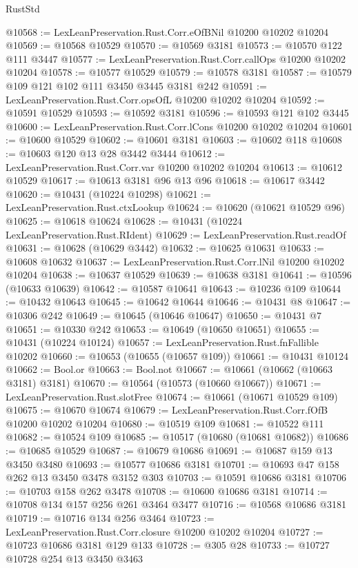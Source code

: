 \begin{lexlean}{RustStd}
\begin{coremodule}
@10568 := LexLeanPreservation.Rust.Corr.eOfBNil @10200 @10202 @10204
@10569 := @10568 @10529
@10570 := @10569 @3181
@10573 := @10570 @122 @111 @3447
@10577 := LexLeanPreservation.Rust.Corr.callOps @10200 @10202 @10204
@10578 := @10577 @10529
@10579 := @10578 @3181
@10587 := @10579 @109 @121 @102 @111 @3450 @3445 @3181 @242
@10591 := LexLeanPreservation.Rust.Corr.opsOfL @10200 @10202 @10204
@10592 := @10591 @10529
@10593 := @10592 @3181
@10596 := @10593 @121 @102 @3445
@10600 := LexLeanPreservation.Rust.Corr.lCons @10200 @10202 @10204
@10601 := @10600 @10529
@10602 := @10601 @3181
@10603 := @10602 @118
@10608 := @10603 @120 @13 @28 @3442 @3444
@10612 := LexLeanPreservation.Rust.Corr.var @10200 @10202 @10204
@10613 := @10612 @10529
@10617 := @10613 @3181 @96 @13 @96
@10618 := @10617 @3442
@10620 := @10431 (@10224 @10298)
@10621 := LexLeanPreservation.Rust.ctxLookup
@10624 := @10620 (@10621 @10529 @96)
@10625 := @10618 @10624
@10628 := @10431 (@10224 LexLeanPreservation.Rust.RIdent)
@10629 := LexLeanPreservation.Rust.readOf
@10631 := @10628 (@10629 @3442)
@10632 := @10625 @10631
@10633 := @10608 @10632
@10637 := LexLeanPreservation.Rust.Corr.lNil @10200 @10202 @10204
@10638 := @10637 @10529
@10639 := @10638 @3181
@10641 := @10596 (@10633 @10639)
@10642 := @10587 @10641
@10643 := @10236 @109
@10644 := @10432 @10643
@10645 := @10642 @10644
@10646 := @10431 @8
@10647 := @10306 @242
@10649 := @10645 (@10646 @10647)
@10650 := @10431 @7
@10651 := @10330 @242
@10653 := @10649 (@10650 @10651)
@10655 := @10431 (@10224 @10124)
@10657 := LexLeanPreservation.Rust.fnFallible @10202
@10660 := @10653 (@10655 (@10657 @109))
@10661 := @10431 @10124
@10662 := Bool.or
@10663 := Bool.not
@10667 := @10661 (@10662 (@10663 @3181) @3181)
@10670 := @10564 (@10573 (@10660 @10667))
@10671 := LexLeanPreservation.Rust.slotFree
@10674 := @10661 (@10671 @10529 @109)
@10675 := @10670 @10674
@10679 := LexLeanPreservation.Rust.Corr.fOfB @10200 @10202 @10204
@10680 := @10519 @109
@10681 := @10522 @111
@10682 := @10524 @109
@10685 := @10517 (@10680 (@10681 @10682))
@10686 := @10685 @10529
@10687 := @10679 @10686
@10691 := @10687 @159 @13 @3450 @3480
@10693 := @10577 @10686 @3181
@10701 := @10693 @47 @158 @262 @13 @3450 @3478 @3152 @303
@10703 := @10591 @10686 @3181
@10706 := @10703 @158 @262 @3478
@10708 := @10600 @10686 @3181
@10714 := @10708 @134 @157 @256 @261 @3464 @3477
@10716 := @10568 @10686 @3181
@10719 := @10716 @134 @256 @3464
@10723 := LexLeanPreservation.Rust.Corr.closure @10200 @10202 @10204
@10727 := @10723 @10686 @3181 @129 @133
@10728 := @305 @28
@10733 := @10727 @10728 @254 @13 @3450 @3463

\end{coremodule}
\end{lexlean}
